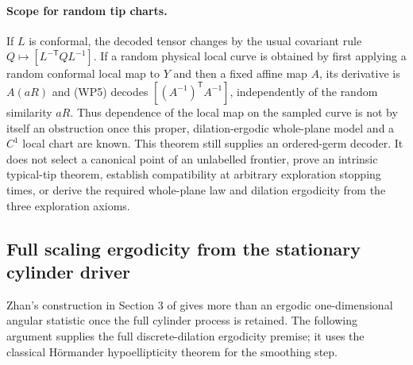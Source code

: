 \documentclass[11pt]{article}
\theoremstyle{definition}\newtheorem{definition}[theorem]{Definition}
\theoremstyle{remark}\newtheorem{remark}[theorem]{Remark}
\begin{document}
\paragraph{Scope for random tip charts.}
If $L$ is conformal, the decoded tensor changes by the usual
covariant rule $Q\mapsto[L^{-\mathsf T}QL^{-1}]$.
If a random physical local curve is obtained by first applying a
random conformal local map to $Y$ and then a fixed affine map $A$,
its derivative is $A(aR)$ and (WP5) decodes
$[(A^{-1})^{\mathsf T}A^{-1}]$, independently of the random
similarity $aR$.  Thus dependence of the local map on the sampled
curve is not by itself an obstruction once this proper,
dilation-ergodic whole-plane model and a $C^1$ local chart are known.
This theorem still supplies an ordered-germ decoder.  It does not
select a canonical point of an unlabelled frontier, prove an
intrinsic typical-tip theorem, establish compatibility at arbitrary
exploration stopping times, or derive the required whole-plane law
and dilation ergodicity from the three exploration axioms.


\subsection{Full scaling ergodicity from the stationary cylinder driver}
\label{sec:wp-cylinder-ergodicity}

Zhan's construction in Section 3 of \cite{zhan-tip} gives more than
an ergodic one-dimensional angular statistic once the full cylinder
process is retained.  The following argument supplies the full
discrete-dilation ergodicity premise; it uses the classical
H\"ormander hypoellipticity theorem for the smoothing step.
\end{document}
